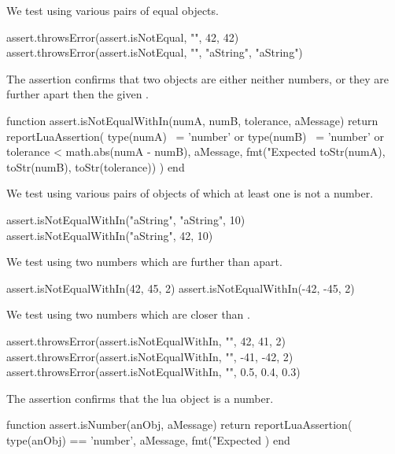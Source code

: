 We test using various pairs of equal objects.

\startLuaTest
  assert.throwsError(assert.isNotEqual, "", 42, 42)
  assert.throwsError(assert.isNotEqual, "", "aString", "aString")
\stopLuaTest
\stopTestCase

\stopTestSuite


The  assertion confirms that two objects are 
either neither numbers, or they are further apart then the given 
. 

\startLuaCode
function assert.isNotEqualWithIn(numA, numB, tolerance, aMessage)
  return reportLuaAssertion(
    type(numA) ~= 'number' or type(numB) ~= 'number'
    or tolerance < math.abs(numA - numB), 
    aMessage,
    fmt("Expected %
      toStr(numA), toStr(numB), toStr(tolerance))
  )
end
\stopLuaCode


We test using various pairs of objects of which at least one is not a 
number. 

\startLuaTest
  assert.isNotEqualWithIn("aString", "aString", 10)
  assert.isNotEqualWithIn("aString", 42, 10)
\stopLuaTest
\stopTestCase


We test using two numbers which are further than  apart. 

\startLuaTest
  assert.isNotEqualWithIn(42, 45, 2)
  assert.isNotEqualWithIn(-42, -45, 2)
\stopLuaTest
\stopTestCase


We test using two numbers which are closer than . 

\startLuaTest
  assert.throwsError(assert.isNotEqualWithIn, "", 42, 41, 2)
  assert.throwsError(assert.isNotEqualWithIn, "", -41, -42, 2)
  assert.throwsError(assert.isNotEqualWithIn, "", 0.5, 0.4, 0.3)
\stopLuaTest
\stopTestCase

\stopTestSuite


The  assertion confirms that the lua object is a 
number. 

\startLuaCode
function assert.isNumber(anObj, aMessage)
  return reportLuaAssertion(
    type(anObj) == 'number',
    aMessage,
    fmt("Expected %
  )
end
\stopLuaCode

